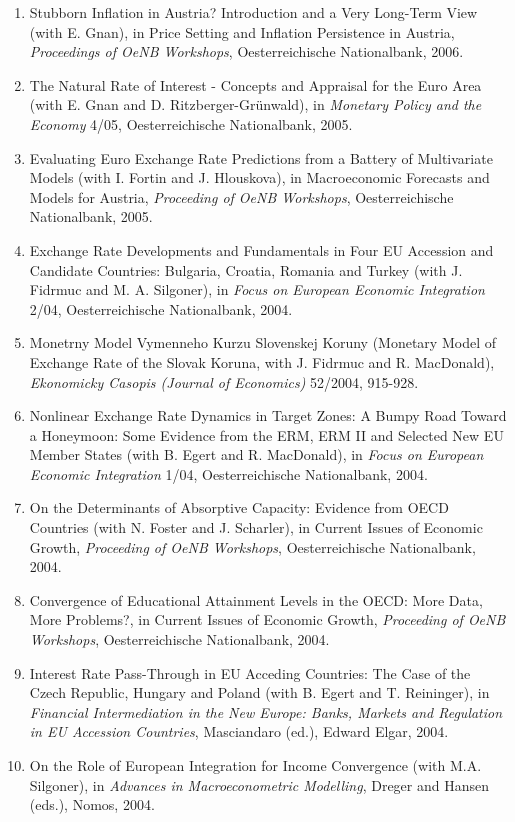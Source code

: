 \documentclass[10pt]{res} %
\begin{document}
\begin{resume}
\begin{enumerate}
\item Stubborn Inflation in Austria? Introduction and a Very Long-Term View (with E. Gnan), in Price Setting and Inflation Persistence in Austria, \textit{Proceedings of OeNB Workshops}, Oesterreichische Nationalbank, 2006.
\item The Natural Rate of Interest - Concepts and Appraisal for the Euro Area (with E. Gnan and D. Ritzberger-Gr\"unwald), in \textit{Monetary Policy and the Economy} 4/05, Oesterreichische Nationalbank, 2005.
\item Evaluating Euro Exchange Rate Predictions from a Battery of Multivariate Models (with I. Fortin and J. Hlouskova), in Macroeconomic Forecasts and Models for Austria, \textit{Proceeding of OeNB Workshops}, Oesterreichische Nationalbank, 2005.
\item Exchange Rate Developments and Fundamentals in Four EU Accession and Candidate Countries: Bulgaria, Croatia, Romania and Turkey (with J. Fidrmuc and M. A. Silgoner), in \textit{Focus on European Economic Integration} 2/04, Oesterreichische Nationalbank, 2004.
\item Monetrny Model Vymenneho Kurzu Slovenskej Koruny (Monetary Model of Exchange Rate of the Slovak Koruna, with J. Fidrmuc and R. MacDonald), \textit{Ekonomicky Casopis (Journal of Economics)} 52/2004, 915-928.
\item Nonlinear Exchange Rate Dynamics in Target Zones: A Bumpy Road Toward a Honeymoon: Some Evidence from the ERM, ERM II and Selected New EU Member States (with B. Egert and R. MacDonald), in \textit{Focus on European Economic Integration} 1/04, Oesterreichische Nationalbank, 2004.
\item On the Determinants of Absorptive Capacity: Evidence from OECD Countries (with N. Foster and J. Scharler), in Current Issues of Economic Growth, \textit{Proceeding of OeNB Workshops}, Oesterreichische Nationalbank, 2004.
\item Convergence of Educational Attainment Levels in the OECD: More Data, More Problems?, in Current Issues of Economic Growth, \textit{Proceeding of OeNB Workshops}, Oesterreichische Nationalbank, 2004.
\item Interest Rate Pass-Through in EU Acceding Countries: The Case of the Czech Republic, Hungary and Poland (with B. Egert and T. Reininger), in \textit{Financial Intermediation in the New Europe: Banks, Markets and Regulation in EU Accession Countries}, Masciandaro (ed.), Edward Elgar, 2004.
\item On the Role of European Integration for Income Convergence (with M.A. Silgoner), in\textit{ Advances in Macroeconometric Modelling}, Dreger and Hansen (eds.), Nomos, 2004.

\end{enumerate}
\end{resume}
\end{document}
